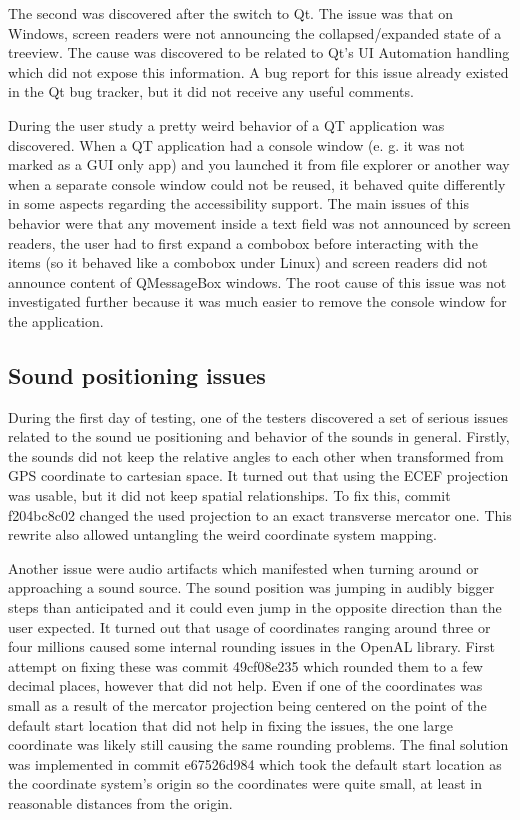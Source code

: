 \documentclass[nolof,digital]{fithesis3}
\begin{document}
The second was discovered after the switch to Qt. The issue was that on Windows, screen readers were not announcing the collapsed/expanded state of a treeview. The cause was discovered to be related to Qt's UI Automation handling which did not expose this information. A bug report for this issue already existed in the Qt bug tracker, but it did not receive any useful comments.

During the user study a pretty weird behavior of a QT application was discovered. When a QT application had a console window (e. g. it was not marked as a GUI only app) and you launched it from file explorer or another way when a separate console window could not be reused, it behaved quite differently in some aspects regarding the accessibility support. The main issues of this behavior were that any movement inside a text field was not announced by screen readers, the user had to first expand a combobox before interacting with the items (so it behaved like a combobox under Linux) and screen readers did not announce content of QMessageBox windows. The root cause of this issue was not investigated further because it was much easier to remove the console window for the application.
\subsection{Sound positioning issues}
During the first day of testing, one of the testers discovered a set of serious issues related to the sound ue positioning and behavior of the sounds in general. Firstly, the sounds did not keep the relative angles to each other when transformed from GPS coordinate to cartesian space. It turned out that using the ECEF projection was usable, but it did not keep spatial relationships. To fix this, commit f204bc8c02 changed the used projection to an exact transverse mercator one. This rewrite also allowed untangling the weird coordinate system mapping.

Another issue were audio artifacts which manifested when turning around or approaching a sound source. The sound position was jumping in audibly bigger steps than anticipated and it could even jump in the opposite direction than the user expected. It turned out that usage of coordinates ranging around three or four millions caused some internal rounding issues in the OpenAL library. First attempt on fixing these was commit 49cf08e235 which rounded them to a few decimal places, however that did not help. Even if one of the coordinates was small as a result of the mercator projection being centered on the point of the default start location that did not help in fixing the issues, the one large coordinate was likely still causing the same rounding problems. The final solution was implemented in commit e67526d984 which took the default start location as the coordinate system's origin so the coordinates were quite small, at least in reasonable distances from the origin.
\end{document}
